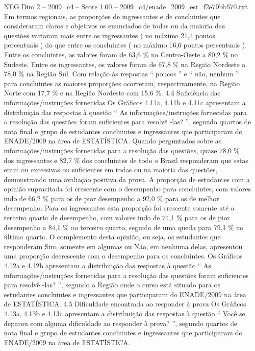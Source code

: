 \begin{textsample}{NEG Dim 2 – 2009\_c4 – Score 1.00 – 2009\_c4/enade\_2009\_est\_f2e70bb570.txt}
Em termos regionais, as proporções de ingressantes e de concluintes que consideraram claros e objetivos os enunciados de todas ou da maioria das questões variaram mais entre os ingressantes ( no máximo 21,4 pontos percentuais ) do que entre os concluintes ( no máximo 16,6 pontos percentuais ).
Entre os concluintes, os valores foram de 63,6 \% no Centro-Oeste a 80,2 \% no Sudeste.
Entre os ingressantes, os valores foram de 67,8 \% na Região Nordeste a 78,0 \% na Região Sul.
Com relação às respostas “ poucos ” e “ não, nenhum ” para concluintes as maiores proporções ocorreram, respectivamente, na Região Norte com 17,7 \% e na Região Nordeste com 15,6 \%. 4.4 Suficiência das informações/instruções fornecidas Os Gráficos 4.11a, 4.11b e 4.11c apresentam a distribuição das respostas à questão “ As informações/instruções fornecidas para a resolução das questões foram suficientes para resolvê -las? ”, segundo quartos de nota final e grupo de estudantes concluintes e ingressantes que participaram do ENADE/2009 na área de ESTATÍSTICA.
Quando perguntados sobre as informações/instruções fornecidas para a resolução das questões, quase 78,0 \% dos ingressantes e 82,7 \% dos concluintes de todo o Brasil responderam que estas eram ou excessivas ou suficientes em todas ou na maioria das questões, demonstrando uma avaliação positiva da prova.
A proporção de estudantes com a opinião supracitada foi crescente com o desempenho para concluintes, com valores indo de 66,2 \% para os de pior desempenho a 92,0 \% para os de melhor desempenho.
Para os ingressantes esta proporção foi crescente somente até o terceiro quarto de desempenho, com valores indo de 74,1 \% para os de pior desempenho a 84,1 \% no terceiro quarto, seguido de uma queda para 79,1 \% no último quarto.
O complemento desta opinião, ou seja, os estudantes que responderam Sim, somente em algumas ou Não, em nenhuma delas, apresentou uma proporção decrescente com o desempenho para os concluintes.
Os Gráficos 4.12a e 4.12b apresentam a distribuição das respostas à questão “ As informações/instruções fornecidas para a resolução das questões foram suficientes para resolvê -las? ”, segundo a Região onde o curso está situado para os estudantes concluintes e ingressantes que participaram do ENADE/2009 na área de ESTATÍSTICA. 4.5 Dificuldade encontrada ao responder à prova Os Gráficos 4.13a, 4.13b e 4.13c apresentam a distribuição das respostas à questão “ Você se deparou com alguma dificuldade ao responder à prova? ”, segundo quartos de nota final e grupo de estudantes concluintes e ingressantes que participaram do ENADE/2009 na área de ESTATÍSTICA.

\end{textsample}
